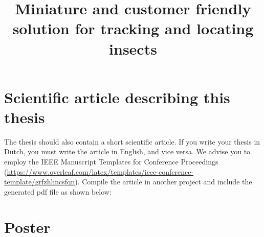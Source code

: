 \documentclass[11pt,a4paper]{report}
\title{Miniature and customer friendly solution for tracking and locating insects}
\subtitle{}
\begin{document}
\preface%

\printnoidxglossary[type=\acronymtype]%

\thesiscontent





\finishthesiscontent

\printbibliography


\appendix


\chapter{Scientific article describing this thesis}
The thesis should also contain a short scientific article. If you write your thesis in Dutch, you must write the article in English, and vice versa. We advise you to employ the IEEE Manuscript Templates for Conference Proceedings (\url{https://www.overleaf.com/latex/templates/ieee-conference-template/grfzhhncsfqn}).
Compile the article in another project and include the generated pdf file as shown below:



\chapter{Poster}
%


\end{document}
